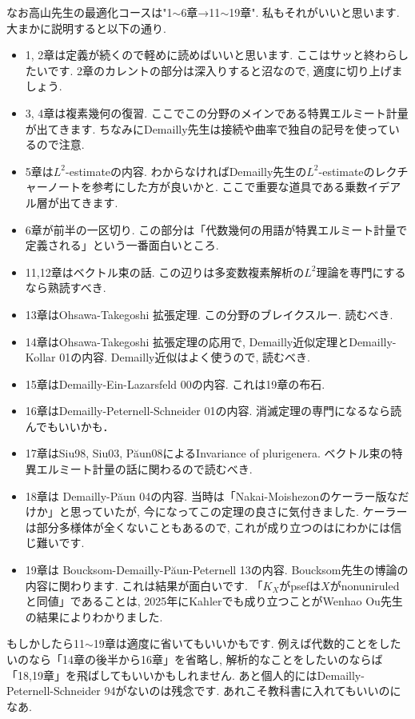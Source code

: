 なお高山先生の最適化コースは"1$\sim$6章→11$\sim$19章". 私もそれがいいと思います. 大まかに説明すると以下の通り.
\vspace{-8pt}
\begin{itemize}[left=0pt]
  \setlength{\parskip}{0cm} %
  \setlength{\itemsep}{0cm} %
\item 1, 2章は定義が続くので軽めに読めばいいと思います.  ここはサッと終わらしたいです. 2章のカレントの部分は深入りすると沼なので, 適度に切り上げましょう. 
\item 3, 4章は複素幾何の復習. ここでこの分野のメインである特異エルミート計量が出てきます. ちなみにDemailly先生は接続や曲率で独自の記号を使っているので注意. 
\item 5章は$L^2$-estimateの内容. わからなければDemailly先生の$L^2$-estimateのレクチャーノートを参考にした方が良いかと. ここで重要な道具である乗数イデアル層が出てきます. 
\item 6章が前半の一区切り. この部分は「代数幾何の用語が特異エルミート計量で定義される」という一番面白いところ. 
\item 11,12章はベクトル束の話. この辺りは多変数複素解析の$L^2$理論を専門にするなら熟読すべき.
\item 13章はOhsawa-Takegoshi 拡張定理. この分野のブレイクスルー. 読むべき.
\item 14章はOhsawa-Takegoshi 拡張定理の応用で, Demailly近似定理とDemailly-Kollar 01の内容. Demailly近似はよく使うので, 読むべき. 
\item 15章はDemailly-Ein-Lazarsfeld 00の内容. これは19章の布石. 
\item 16章はDemailly-Peternell-Schneider 01の内容. 消滅定理の専門になるなら読んでもいいかも．
\item 17章はSiu98, Siu03, P\u{a}un08によるInvariance of plurigenera. ベクトル束の特異エルミート計量の話に関わるので読むべき.
\item 18章は Demailly-P\u{a}un 04の内容. 当時は「Nakai-Moishezonのケーラー版なだけか」と思っていたが, 今になってこの定理の良さに気付きました. ケーラーは部分多様体が全くないこともあるので, これが成り立つのはにわかには信じ難いです. 
\item 19章は Boucksom-Demailly-P\u{a}un-Peternell 13の内容. Boucksom先生の博論の内容に関わります. これは結果が面白いです. 「$K_X$がpsefは$X$がnonuniruledと同値」であることは, 2025年にKahlerでも成り立つことがWenhao Ou先生の結果によりわかりました. 
\end{itemize}
もしかしたら11$\sim$19章は適度に省いてもいいかもです. 例えば代数的ことをしたいのなら「14章の後半から16章」を省略し, 解析的なことをしたいのならば「18,19章」を飛ばしてもいいかもしれません. 
あと個人的にはDemailly-Peternell-Schneider 94がないのは残念です. あれこそ教科書に入れてもいいのになあ. 

